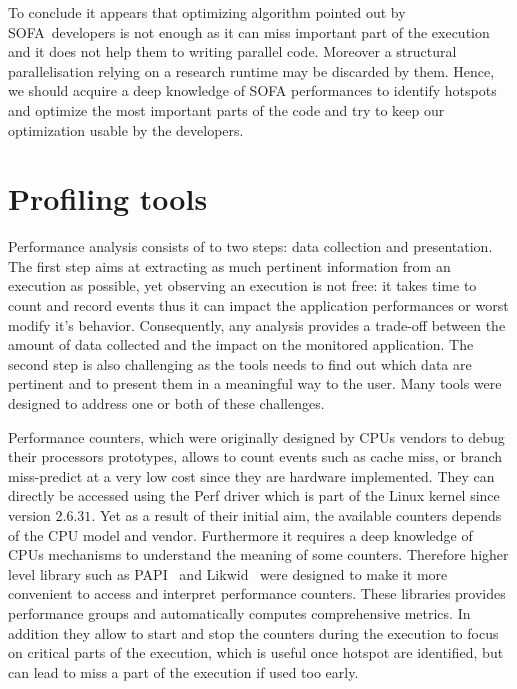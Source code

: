 To conclude it appears that optimizing algorithm pointed out by \gls{SOFA} developers is not enough as it can miss important part of the execution and it does not help them to writing parallel code.
Moreover a structural parallelisation relying on a research runtime may be discarded by them.
Hence, we should acquire a deep knowledge of \gls{SOFA} performances to identify hotspots and optimize the most important parts of the code and try to keep our optimization usable by the developers.

\section{Profiling tools}
\label{sec:prof-tools}

Performance analysis consists of to two steps: data collection and presentation.
The first step aims at extracting as much pertinent information from an execution as possible, yet observing an execution is not free: it takes time to count and record events thus it can impact the application performances or worst modify it's behavior.
Consequently, any analysis provides a trade-off between the amount of data collected and the impact on the monitored application.
The second step is also challenging as the tools needs to find out which data are pertinent and to present them in a meaningful way to the user.
Many tools were designed to address one or both of these challenges.

Performance counters, which were originally designed by \glspl{CPU} vendors to debug their processors prototypes, allows to count events such as cache miss, or branch miss-predict at a very low cost since they are hardware implemented.
They can directly be accessed using the \gls{Perf} driver which is part of the \gls{Linux} kernel since version $2.6.31$.
Yet as a result of their initial aim, the available counters depends of the \gls{CPU} model and vendor.
Furthermore it requires a deep knowledge of \glspl{CPU} mechanisms to understand the meaning of some counters.
Therefore higher level library such as \gls{PAPI}~\cite{Browne00Portable,Malony11Parallel,Weaver13PAPI} and \gls{Likwid}~\cite{Treibig10LIKWID} were designed to make it more convenient to access and interpret performance counters.
These libraries provides performance groups and automatically computes comprehensive metrics.
In addition they allow to start and stop the counters during the execution to focus on critical parts of the execution, which is useful once hotspot are identified, but can lead to miss a part of the execution if used too early.

